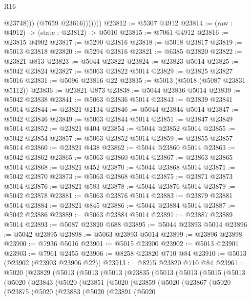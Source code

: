 \begin{lexlean}{R16}
\begin{coremodule}
                      @23748)))
                (@7659 @23616)))))))
@23812 := @5307 @4912
@23814 := (raw : @4912) -> (state : @23812) -> @5010
@23815 := @7061 @4912
@23816 := @23815 @4902
@23817 := @5290 @23816
@23818 := @5018 @23817
@23819 := @5013 @23818
@23820 := @5294 @23816
@23821 := @6385 @23820
@23822 := @23821 @813
@23823 := @5044 @23822
@23824 := @23823 @5014
@23825 := @5042 @23824
@23827 := @5063 @23822 @5014
@23829 := @23825 @23827 @5016
@23831 := @5096 @23816 @22
@23835 := @5013 (@5018 (@5087 @23831 @5112))
@23836 := @23821 @873
@23838 := @5044 @23836 @5014
@23839 := @5042 @23838
@23841 := @5063 @23836 @5014
@23843 := @23839 @23841 @5014
@23844 := @23821 @2134
@23846 := @5044 @23844 @5014
@23847 := @5042 @23846
@23849 := @5063 @23844 @5014
@23851 := @23847 @23849 @5014
@23852 := @23821 @404
@23854 := @5044 @23852 @5014
@23855 := @5042 @23854
@23857 := @5063 @23852 @5014
@23859 := @23855 @23857 @5014
@23860 := @23821 @438
@23862 := @5044 @23860 @5014
@23863 := @5042 @23862
@23865 := @5063 @23860 @5014
@23867 := @23863 @23865 @5014
@23868 := @23821 @452
@23870 := @5044 @23868 @5014
@23871 := @5042 @23870
@23873 := @5063 @23868 @5014
@23875 := @23871 @23873 @5014
@23876 := @23821 @583
@23878 := @5044 @23876 @5014
@23879 := @5042 @23878
@23881 := @5063 @23876 @5014
@23883 := @23879 @23881 @5014
@23884 := @23821 @845
@23886 := @5044 @23884 @5014
@23887 := @5042 @23886
@23889 := @5063 @23884 @5014
@23891 := @23887 @23889 @5014
@23893 := @5087 @23820 @688
@23895 := @5044 @23893 @5014
@23896 := @5042 @23895
@23898 := @5063 @23893 @5014
@23899 := @23896 @23898
@23900 := @7936 @5016
@23901 := @5015 @23900
@23902 := @5013 @23901
@23903 := @7961 @2455
@23906 := @8258 @23820 @710 @84
@23910 := @5013 (@23902 (@23903 @23906 @22))
@23913 := @8275 @23820 @710 @84
@23961 := @5020
    (@23829
      (@5013
        (@5013
          (@5013
            (@23835
              (@5013
                (@5013
                  (@5015
                    (@5013
                      (@5020
                        (@23843
                          (@5020
                            (@23851
                              (@5020
                                (@23859
                                  (@5020
                                    (@23867
                                      (@5020
                                        (@23875
                                          (@5020
                                            (@23883
                                              (@5020
                                                (@23891
                                                  (@5020

\end{coremodule}
\end{lexlean}
